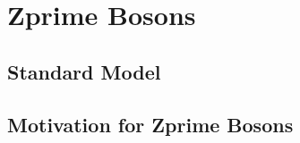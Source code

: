 \chapter[Zprime Bosons]{Zprime Bosons}
\label{chap:Zp}

\section{Standard Model}
\label{sec:SM}

\section{Motivation for Zprime Bosons}
\label{sec:Zp}